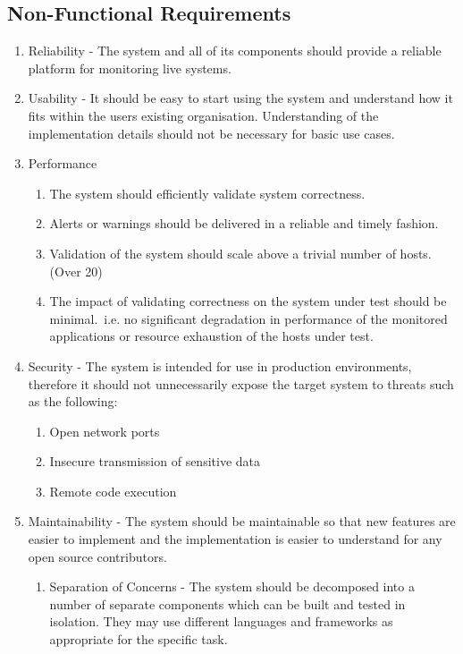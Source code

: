 \documentclass{cshonours}
\begin{document}
\pagebreak
\subsection{Non-Functional Requirements}
\begin{enumerate}
  \item Reliability - The system and all of its components should provide a reliable platform for monitoring live systems.
  \item Usability - It should be easy to start using the system and understand how it fits within the users existing organisation. Understanding of the implementation details should not be necessary for basic use cases.
  \item Performance
    \begin{enumerate}
      \item The system should efficiently validate system correctness.
      \item Alerts or warnings should be delivered in a reliable and timely fashion.
      \item Validation of the system should scale above a trivial number of hosts. (Over 20)
      \item The impact of validating correctness on the system under test should be minimal.\ i.e. no significant degradation in performance of the monitored applications or resource exhaustion of the hosts under test.
    \end{enumerate}
  \item Security - The system is intended for use in production environments, therefore it should not unnecessarily expose the target system to threats such as the following:
    \begin{enumerate}
      \item Open network ports
      \item Insecure transmission of sensitive data
      \item Remote code execution
    \end{enumerate}
  \item Maintainability - The system should be maintainable so that new features are easier to implement and the implementation is easier to understand for any open source contributors.
    \begin{enumerate}
      \item Separation of Concerns - The system should be decomposed into a number of separate components which can be built and tested in isolation. They may use different languages and frameworks as appropriate for the specific task.

\end{enumerate}
\end{enumerate}
\end{document}
